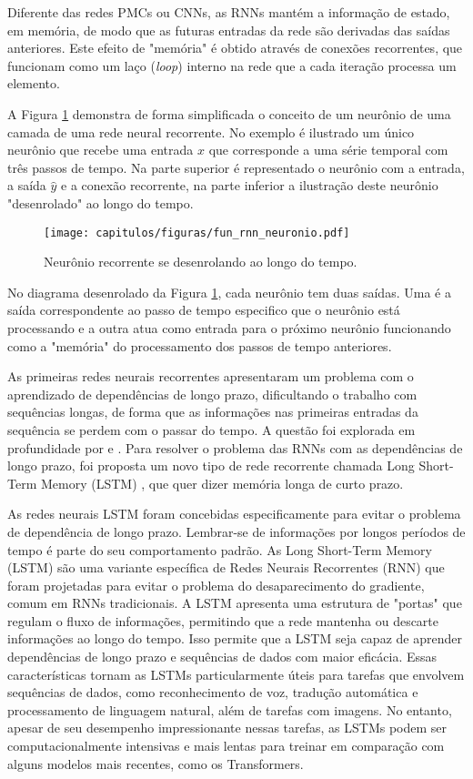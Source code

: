 Diferente das redes PMCs ou CNNs, as RNNs mantém a informação de estado, em memória, de modo que as futuras entradas da rede são derivadas das saídas anteriores. Este efeito de "memória" é obtido através de conexões recorrentes, que funcionam como um laço (\textit{loop}) interno na rede que a cada iteração processa um elemento. 

A Figura \ref{fig:fun_rnn_neuronio} demonstra de forma simplificada o conceito de um neurônio de uma camada de uma rede neural recorrente. No exemplo é ilustrado um único neurônio que recebe uma entrada $x$ que corresponde a uma série temporal com três passos de tempo. Na parte superior
é representado o neurônio com a entrada, a saída $\hat{y}$ e a conexão recorrente, na parte inferior a ilustração deste neurônio "desenrolado" ao longo do tempo.

\begin{figure}[!ht]
\centering
\texttt{[image: capitulos/figuras/fun\_rnn\_neuronio.pdf]}
\caption{Neurônio recorrente se desenrolando ao longo do tempo.}
\label{fig:fun_rnn_neuronio}
\end{figure}

No diagrama desenrolado da Figura \ref{fig:fun_rnn_neuronio}, cada neurônio tem duas saídas. Uma é a saída correspondente ao passo de tempo especifico que o neurônio está processando e a outra atua como entrada para o próximo neurônio funcionando como a "memória" do processamento dos passos de tempo anteriores.

As primeiras redes neurais recorrentes apresentaram um problema com o aprendizado de dependências de longo prazo, dificultando o trabalho com sequências longas, de forma que as informações nas primeiras entradas da sequência se perdem com o passar do tempo. A questão foi explorada em profundidade por \cite{hochreiter1997long} e \cite{bengio1994learning}. Para resolver o problema das RNNs com as dependências de longo prazo, foi proposta um novo tipo de rede recorrente chamada Long Short-Term Memory (LSTM) \cite{hochreiter1997long, zaremba2014recurrent, graves2005framewise}, que quer dizer memória longa de curto prazo. 

As redes neurais LSTM foram concebidas especificamente para evitar o problema de dependência de longo prazo. Lembrar-se de informações por longos períodos de tempo é parte do seu comportamento padrão. As Long Short-Term Memory (LSTM) são uma variante específica de Redes Neurais Recorrentes (RNN) que foram projetadas para evitar o problema do desaparecimento do gradiente, comum em RNNs tradicionais. A LSTM apresenta uma estrutura de "portas" que regulam o fluxo de informações, permitindo que a rede mantenha ou descarte informações ao longo do tempo. Isso permite que a LSTM seja capaz de aprender dependências de longo prazo e sequências de dados com maior eficácia. Essas características tornam as LSTMs particularmente úteis para tarefas que envolvem sequências de dados, como reconhecimento de voz, tradução automática e processamento de linguagem natural, além de tarefas com imagens. No entanto, apesar de seu desempenho impressionante nessas tarefas, as LSTMs podem ser computacionalmente intensivas e mais lentas para treinar em comparação com alguns modelos mais recentes, como os Transformers.

